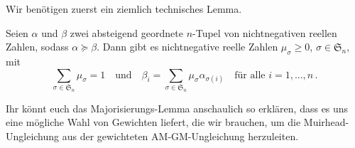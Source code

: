 Wir benötigen zuerst ein ziemlich technisches Lemma.
\begin{satzmitnamen}
	Seien $\alpha$ und $\beta$ zwei absteigend geordnete $n$-Tupel von nichtnegativen reellen Zahlen, sodass $\alpha\succcurlyeq \beta$. Dann gibt es nichtnegative reelle Zahlen $\mu_\sigma\geqslant 0$, $\sigma\in\mathfrak S_n$, mit
	\begin{equation*}
		\sum_{\sigma\in\mathfrak S_n}\mu_\sigma=1\quad\text{und}\quad \beta_i=\sum_{\sigma\in\mathfrak S_n}\mu_\sigma\alpha_{\sigma(i)}\quad\text{für alle }i=1,\dotsc,n\,.
	\end{equation*}
\end{satzmitnamen}
Ihr könnt euch das Majorisierungs-Lemma anschaulich so erklären, dass es uns eine mögliche Wahl von Gewichten liefert, die wir brauchen, um die Muirhead-Ungleichung aus der gewichteten AM-GM-Ungleichung herzuleiten.
